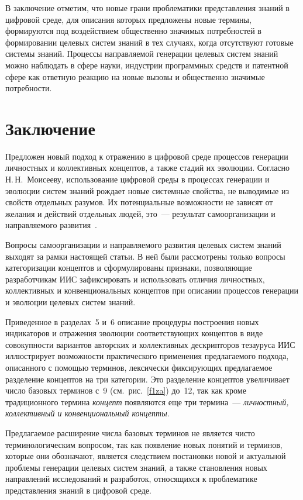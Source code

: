 \begin{multicols}{2}
   В заключение отметим, что новые грани проблематики представления знаний в цифровой
среде, для описания которых предложены новые термины, формируются под воздействием
общественно значимых потребностей в формировании целевых систем знаний в тех случаях,
когда отсутствуют готовые системы знаний. Процессы направляемой генерации целевых
систем знаний можно наблюдать в сфере науки, индустрии программных средств и
патентной сфере как ответную реакцию на новые вызовы и общественно значимые
потребности.

\section{Заключение}

   Предложен новый подход к отражению в циф\-ро\-вой среде процессов генерации
личностных и коллективных концептов, а также стадий их эволюции. Согласно
Н.\,Н.~Моисееву, использование цифровой среды в процессах генерации и эволюции систем
знаний рождает новые системные свойства, не выводимые из свойств отдельных разумов. Их
потенциальные возможности не зависят от желания и действий отдельных людей, это~---
результат самоорганизации и направляемого развития~\cite{20za}.

   Вопросы самоорганизации и направляемого развития целевых систем знаний выходят за
рамки настоящей статьи. В ней были рассмотрены только вопросы категоризации концептов
и сформулированы признаки, позволяющие разработчикам ИИС зафиксировать и
использовать отличия личностных, коллективных и конвенциональных концептов при
описании процессов генерации и эволюции целевых систем знаний.

   Приведенное в разделах~5 и~6 описание процедуры построения новых индикаторов и
отражения эволюции соответствующих концептов в виде совокупности вариантов авторских
и коллективных дескрипторов тезауруса ИИС иллюстрирует возможности практического
применения пред\-ла\-га\-емо\-го подхода, описанного с помощью терминов, лексически
фиксирующих предлагаемое разделение концептов на три категории. Это разделение
концептов увеличивает число базовых терминов с~9 (см.\ рис.~\ref{f1za}) до~12, так как
кроме традиционного термина \textit{концепт} появляются еще три термина~---
\textit{личностный, коллективный и конвенциональный концепты}.

   Предлагаемое расширение числа базовых терминов не является чисто
терминологическим вопросом, так как появление новых понятий и терминов, которые они
обозначают, является следствием постановки новой и актуальной проблемы генерации
целевых систем знаний, а также становления новых направлений исследований и разработок,
относящихся к проблематике представления знаний в цифровой среде.


\end{multicols}
